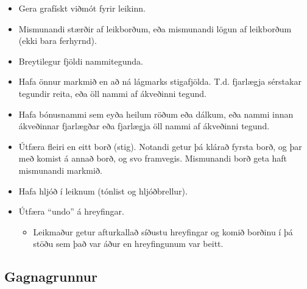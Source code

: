 \documentclass[11pt,a4paper,oneside]{article}
\begin{document}
	\begin{itemize}
		\item Gera grafískt viðmót fyrir leikinn.
		\item Mismunandi stærðir af leikborðum, eða mismunandi lögun af leikborðum (ekki bara ferhyrnd).
		\item Breytilegur fjöldi nammitegunda.
		\item Hafa önnur markmið en að ná lágmarks stigafjölda. T.d. fjarlægja sérstakar tegundir reita, eða öll nammi af ákveðinni tegund.
		\item Hafa bónusnammi sem eyða heilum röðum eða dálkum, eða nammi innan ákveðinnar fjarlægðar eða fjarlægja öll nammi af ákveðinni tegund.
		\item Útfæra fleiri en eitt borð (stig). Notandi getur þá klárað fyrsta borð, og þar með komist á annað borð, og svo framvegis. Mismunandi borð geta haft mismunandi markmið.
		\item Hafa hljóð í leiknum (tónlist og hljóðbrellur).
		\item Útfæra "`undo"' á hreyfingar.
			\begin{itemize}
				\item Leikmaður getur afturkallað síðustu hreyfingar og komið borðinu í þá stöðu sem það var áður en hreyfingunum var beitt.
			\end{itemize}
	\end{itemize}

	\subsection*{Gagnagrunnur}
\end{document}

